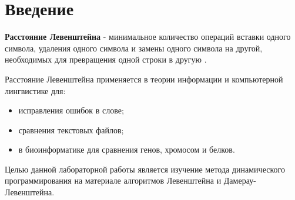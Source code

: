 \documentclass[12pt]{report}
\begin{document}


\tableofcontents

\newpage
\chapter*{Введение}
\textbf{Расстояние Левенштейна} - минимальное количество операций вставки одного символа, удаления одного символа и замены одного символа на другой, необходимых для превращения одной строки в другую \cite{declaration}.

Расстояние Левенштейна применяется в теории информации и компьютерной лингвистике для:

\begin{itemize}
	\item исправления ошибок в слове;
	\item сравнения текстовых файлов;
	\item в биоинформатике для сравнения генов, хромосом и белков.
\end{itemize}

Целью данной лабораторной работы является изучение метода динамического программирования на материале алгоритмов
Левенштейна и Дамерау-Левенштейна. 
\end{document}
